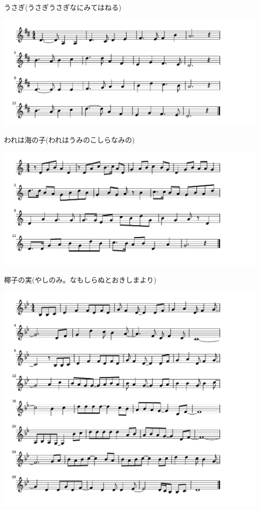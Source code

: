 \documentclass[a4paper]{ltjsarticle}
\begin{document}
\vspace{-10mm} \hspace{10mm}
うさぎ(うさぎうさぎなにみてはねる)

\includegraphics[clip]{warewaumi_crop.pdf}

\vspace{-10mm} \hspace{10mm}
われは海の子(われはうみのこしらなみの)

\includegraphics[clip]{yashinomi_crop.pdf}

\vspace{-10mm} \hspace{10mm}
椰子の実(やしのみ。なもしらぬとおきしまより)

\includegraphics[clip]{yesterdayonce_crop.pdf}
\end{document}
